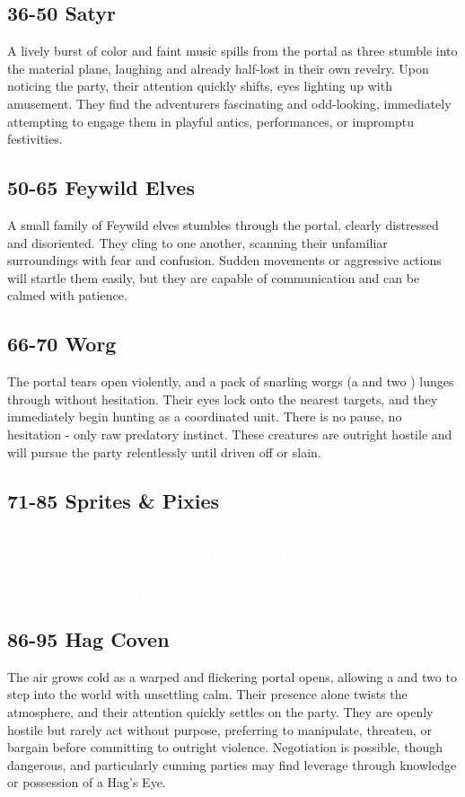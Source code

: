 \subsection*{36-50 Satyr}
{\entryfont A lively burst of color and faint music spills from the portal as three \hyperref[monster:SatyrReveler]{} stumble into the material plane, laughing and already half-lost in their own revelry. Upon noticing the party, their attention quickly shifts, eyes lighting up with amusement. They find the adventurers fascinating and odd-looking, immediately attempting to engage them in playful antics, performances, or impromptu festivities.}
\subsection*{50-65 Feywild Elves}
{\entryfont A small family of Feywild elves stumbles through the portal, clearly distressed and disoriented. They cling to one another, scanning their unfamiliar surroundings with fear and confusion. Sudden movements or aggressive actions will startle them easily, but they are capable of communication and can be calmed with patience.}
\subsection*{66-70 Worg}
{\entryfont The portal tears open violently, and a pack of snarling worgs (a \hyperref[monster:DireWorg]{} and two \hyperref[monster:Worg]{}) lunges through without hesitation. Their eyes lock onto the nearest targets, and they immediately begin hunting as a coordinated unit. There is no pause, no hesitation - only raw predatory instinct. These creatures are outright hostile and will pursue the party relentlessly until driven off or slain.}
\vspace*{-0.1em}\subsection*{71-85 Sprites \& Pixies}
{\entryfont\textcolor{white}{\textbf{A burst of glittering light scatters into dozens of tiny winged figures as sprites and pixies emerge from the portal. The moment they notice the party, panic spreads among them. Without hesitation, they scatter in all directions, darting through the air and vanishing into foliage.}}}
\subsection*{86-95 Hag Coven}
{\entryfont The air grows cold as a warped and flickering portal opens, allowing a \hyperref[monster:BheurHag]{} and two \hyperref[monster:AnnisHag]{} to step into the world with unsettling calm. Their presence alone twists the atmosphere, and their attention quickly settles on the party. They are openly hostile but rarely act without purpose, preferring to manipulate, threaten, or bargain before committing to outright violence. Negotiation is possible, though dangerous, and particularly cunning parties may find leverage through knowledge or possession of a Hag's Eye.}
